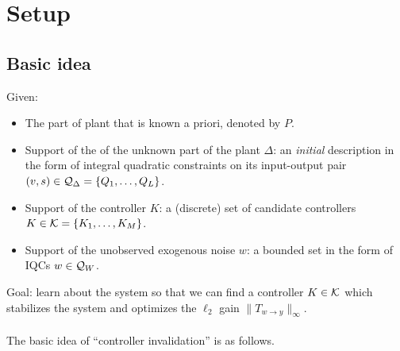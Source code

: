 \documentclass[11pt, onecolumn]{article}
\begin{document}
\section{Setup}

\subsection{Basic idea}

Given:
\begin{itemize}
\item The part of plant that is known a priori, denoted by $P$.
\item Support of the of the unknown part of the plant $\Delta$: an {\em initial} description in the
  form of integral quadratic constraints on its input-output pair $(v,s)\in \mathcal Q_\Delta = \{Q_1,\dots, Q_L\}$.
\item Support of the controller $K$: a (discrete) set of candidate controllers $K \in \mathcal K = \{K_1,\dots,
  K_M\}$.
\item Support of the unobserved exogenous noise $w$: a bounded set in the form of IQCs $w\in \mathcal
  Q_{W}$.
\end{itemize}
Goal: learn about the system so that we can find a controller $K\in\mathcal K$ which stabilizes the
system and optimizes the $\ell_2$ gain $\|T_{w\to y}\|_{\infty}$.

\paragraph{}
The basic idea of ``controller invalidation'' is as follows.
\end{document}
